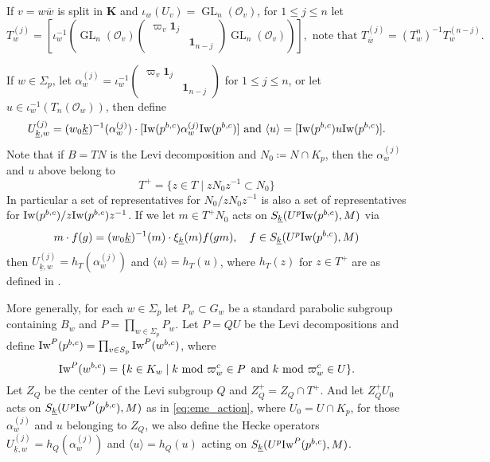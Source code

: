\documentclass[leqno]{amsart}
\newcommand{\wt}[1]{\underline{ #1 }}
\newcommand{\Iw}{\textnormal{Iw}}
\newcommand{\bw}{\overline{w}}
\DeclareMathOperator{\GL}{GL}
\newcommand{\id}{\mathbf{1}}
\newcommand{\K}{{\mathbf{K}}} %
\newcommand{\oo}{\mathcal{O}} %
\theoremstyle{definition}
\theoremstyle{remark}
\begin{document}
If $v=w\bw$ is split in  $\K$
and  $\iota_w(U_v)=\GL_n(\oo_v)$, 
for $1\leq j\leq n$ let
\begin{equation}
	T_w^{(j)}=
	\left[\iota_w^{-1}\left(
	\GL_n(\oo_v)
	\begin{pmatrix}
		\varpi_v\id_{j}&\\&\id_{n-j}
	\end{pmatrix}
	\GL_n(\oo_v)
	\right)\right],
	\text{ note that }
	T_{\bw}^{(j)}=(T_{w}^{{n}})^{-1}T_w^{(n-j)}.
\end{equation}

If $w\in \Sigma_p$, let  
$\alpha_w^{(j)}=\iota_w^{-1}
\left(\begin{smallmatrix}
\varpi_v\id_{j}&\\&\id_{n-j} 
\end{smallmatrix}\right)$ for $1\leq j\leq n$,
or let $u\in \iota_w^{-1}(T_n(\oo_w))$, then define
\begin{equation}
	U_{\wt{k},w}^{(j)}=
	(w_0\wt{k})^{-1}(\alpha_{w}^{(j)})\cdot
	[\Iw(p^{b,c})\alpha_w^{(j)}\Iw(p^{b,c})]
	\text{ and }
	\langle u\rangle= [\Iw(p^{b,c})u\Iw(p^{b,c})].
\end{equation}
Note that if $B=TN$ is the Levi decomposition
and  $N_0\coloneqq N\cap K_p$,
then the $\alpha_w^{(j)}$ and $u$ above belong to 
\[
	T^+=\{z\in T\mid zN_0z^{-1}\subset N_0\}
\]
In particular a set of representatives for $N_0/zN_0z^{-1}$ 
is also a set of representatives for $\Iw(p^{b,c})/z\Iw(p^{b,c})z^{-1}$.
If we let $m\in T^+N_0$ acts on  $S_{\wt{k}}(U^p\Iw(p^{b,c}),M)$ via 
\begin{equation}\label{eq:eme_action}
	m\cdot f(g)=(w_0\wt{k})^{-1}(m)\cdot \xi_{\wt{k}}(m)f(gm),\quad
	f\in S_{\wt{k}}(U^p\Iw(p^{b,c}),M)
\end{equation}
then $U_{\wt{k},w}^{(j)}=h_T(\alpha_w^{(j)})$ and $\langle u\rangle=h_T(u)$,
where $h_T(z)$ for $z\in T^+$ are as defined in 
\cite[Def 3.1.3]{emeI}.



More generally, 
for each $w\in \Sigma_p$ let $P_w\subset G_w$
be a standard parabolic subgroup containing $B_w$
and $P=\prod_{w\in \Sigma_p}P_w$.
Let $P=QU$ be the Levi decompositions and define
$\Iw^P(p^{b,c})=\prod_{v\in S_p}\Iw^P(w^{b,c})$, where
\[
	\Iw^P(w^{b,c})=
	\{
	k\in K_w\mid 
	k\text{ mod } \varpi_w^c \in P\,\text{ and }
	k\text{ mod } \varpi_w^c \in U
	\}.
\]
Let $Z_Q$ be
the center of the Levi subgroup $Q$ 
and $Z_Q^+=Z_Q\cap T^+$.
And let $Z_Q^+U_0$ acts on  $S_{\wt{k}}(U^p\Iw^P(p^{b,c}),M)$
as in \eqref{eq:eme_action},
where $U_0=U\cap K_p$,
for those $\alpha_w^{(j)}$ and $u$ belonging to  $Z_Q$, we also define
the Hecke operators 
$U_{\wt{k},w}^{(j)}=h_Q(\alpha_w^{(j)})$ and $\langle u\rangle=h_Q(u)$
acting on $S_{\wt{k}}(U^p\Iw^P(p^{b,c}),M)$.
\end{document}
